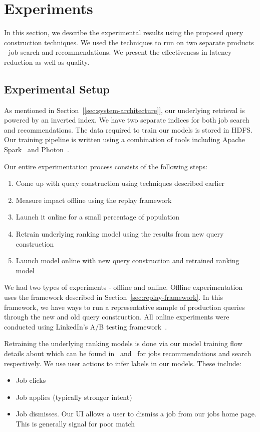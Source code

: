 
\section{Experiments}
In this section, we describe the experimental results using the proposed query
construction techniques. We used the techniques to run on two separate products
- job search and recommendations. We present the effectiveness in latency
reduction as well as quality. 

\subsection{Experimental Setup}
As mentioned in Section~[\ref{sec:system-architecture}], our underlying
retrieval is powered by an inverted index. We have two separate indices for
both job search and recommendations. The data required to train our models is
stored in HDFS. Our training pipeline is written using a combination of tools
including Apache Spark~\cite{meng2016mllib} and Photon~\cite{XianXing2016}. 

Our entire experimentation process consists of the following steps:
\begin{enumerate}
        \item Come up with query construction using techniques described
            earlier
        \item Measure impact offline using the replay framework
        \item Launch it online for a small percentage of population
        \item Retrain underlying ranking model using the results from new query
            construction
        \item Launch model online with new query construction and retrained
            ranking model
\end{enumerate}

We had two types of experiments - offline and online. Offline experimentation
uses the framework described in Section~\ref{sec:replay-framework}. In this
framework, we have ways to run a representative sample of production queries
through the new and old query construction. 
All
online experiments were conducted using LinkedIn's A/B testing 
framework~\cite{xu2015infrastructure}.

Retraining the underlying ranking models is done via our model training flow
details about which can be found in~\cite{zhang2016glmix} and~\cite{liget} for
jobs recommendations and search respectively. We use user actions to infer
labels in our models. These include:
\begin{itemize}
        \item Job clicks
        \item Job applies (typically stronger intent)
        \item Job dismisses. Our UI allows a user to dismiss a job from our
            jobs home page. This is generally signal for poor match
\end{itemize}

